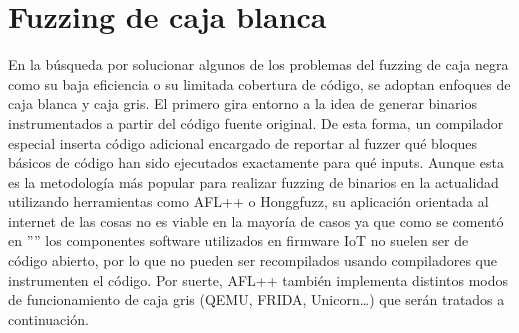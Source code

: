 \section{Fuzzing de caja blanca}
En la búsqueda por solucionar algunos de los problemas del fuzzing de caja negra como su baja eficiencia o su limitada cobertura de código, se 
adoptan enfoques de caja blanca y caja gris. El primero gira entorno a la idea de generar binarios instrumentados a partir del código fuente original. De esta forma, un compilador 
especial inserta código adicional encargado de reportar al fuzzer qué bloques básicos de código han sido ejecutados exactamente para qué inputs.
Aunque esta es la metodología más popular para realizar fuzzing de binarios en la actualidad utilizando herramientas como AFL++\cite{afl++} o 
Honggfuzz\cite{honggfuzz}, su aplicación orientada al internet de las cosas no es viable en la mayoría de casos ya que como se comentó en 
'''' los componentes software utilizados en firmware IoT no suelen ser de código abierto, por lo que no pueden ser recompilados 
usando compiladores que instrumenten el código. Por suerte, AFL++ también implementa distintos modos de funcionamiento de caja gris
(QEMU\cite{qemuafl}, FRIDA\cite{frida}, Unicorn\cite{unicorn}\dots) que serán tratados a continuación.

